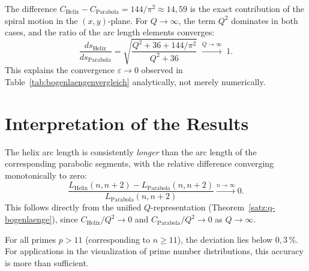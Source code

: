 \begin{remark}
The difference $C_{\mathrm{Helix}} - C_{\mathrm{Parabola}} = 144/\pi^2
\approx 14{,}59$ is the exact contribution of the spiral motion in the
$(x,y)$-plane. For $Q \to \infty$, the term $Q^2$ dominates in both cases,
and the ratio of the arc length elements converges:
\[
  \frac{ds_{\mathrm{Helix}}}{ds_{\mathrm{Parabola}}}
  = \sqrt{\frac{Q^2 + 36 + 144/\pi^2}{Q^2 + 36}}
  \;\xrightarrow{Q\to\infty}\; 1.
\]
This explains the convergence $\varepsilon \to 0$ observed in
Table~\ref{tab:bogenlaengenvergleich} analytically, not merely
numerically.
\end{remark}

\section{Interpretation of the Results}

\begin{proposition}
\label{prop:konvergenz}
The helix arc length is consistently \emph{longer} than the arc length of the
corresponding parabolic segments, with the relative difference
converging monotonically to zero:
\[
\frac{L_{\mathrm{Helix}}(n, n+2) - L_{\mathrm{Parabola}}(n, n+2)}
{L_{\mathrm{Parabola}}(n, n+2)}
\xrightarrow{n \to \infty} 0.
\]
This follows directly from the unified $Q$-representation
(Theorem~\ref{satz:q-bogenlaenge}), since $C_{\mathrm{Helix}}/Q^2 \to 0$
and $C_{\mathrm{Parabola}}/Q^2 \to 0$ as $Q \to \infty$.
\end{proposition}

\begin{corollary}
For all primes $p > 11$ (corresponding to $n \ge 11$), the deviation
lies below $0{,}3\,\%$. For applications in the visualization of prime number distributions,
this accuracy is more than sufficient.
\end{corollary}
